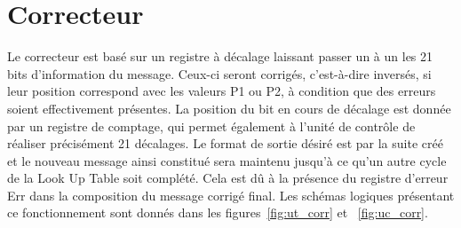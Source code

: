 \documentclass[a4paper, 11pt, svgnames]{report}
\begin{document}
        \section{Correcteur}
            Le correcteur est basé sur un registre à décalage laissant passer
            un à un les 21 bits d'information du message. Ceux-ci seront
            corrigés, c'est-à-dire inversés, si leur position correspond avec
            les valeurs P1 ou P2, à condition que des erreurs soient
            effectivement présentes. La position du bit en cours de décalage
            est donnée par un registre de comptage, qui permet également à
            l'unité de contrôle de réaliser précisément 21 décalages. Le format
            de sortie désiré est par la suite créé et le nouveau message ainsi
            constitué sera maintenu jusqu'à ce qu'un autre cycle de la Look Up
            Table soit complété. Cela est dû à la présence du registre d'erreur
            Err dans la composition du message corrigé final. Les schémas logiques
            présentant ce fonctionnement sont donnés dans
            les figures~\ref{fig:ut_corr} et ~\ref{fig:uc_corr}.
\end{document}
